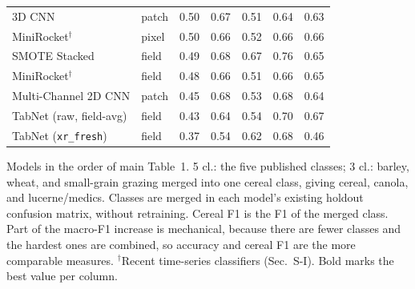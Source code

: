 \documentclass[preprint,authoryear,3p]{elsarticle}
\begin{document}
\begin{table}[!ht]
\begin{tabular}{llccccc}
3D CNN & patch & 0.50 & 0.67 & 0.51 & 0.64 & 0.63 \\
MiniRocket$^{\dagger}$ & pixel & 0.50 & 0.66 & 0.52 & 0.66 & 0.66 \\
SMOTE Stacked & field & 0.49 & 0.68 & 0.67 & 0.76 & 0.65 \\
MiniRocket$^{\dagger}$ & field & 0.48 & 0.66 & 0.51 & 0.66 & 0.65 \\
Multi-Channel 2D CNN & patch & 0.45 & 0.68 & 0.53 & 0.68 & 0.64 \\
TabNet (raw, field-avg) & field & 0.43 & 0.64 & 0.54 & 0.70 & 0.67 \\
TabNet (\texttt{xr\_fresh}) & field & 0.37 & 0.54 & 0.62 & 0.68 & 0.46 \\
\bottomrule
\end{tabular}
\par\vspace{3pt}
\begin{minipage}{\linewidth}
\footnotesize
Models in the order of main Table~1. 5 cl.: the five published classes; 3 cl.: barley, wheat, and small-grain grazing merged into one cereal class, giving cereal, canola, and lucerne/medics. Classes are merged in each model's existing holdout confusion matrix, without retraining. Cereal F1 is the F1 of the merged class. Part of the macro-F1 increase is mechanical, because there are fewer classes and the hardest ones are combined, so accuracy and cereal F1 are the more comparable measures. $^{\dagger}$Recent time-series classifiers (Sec.~S-I). Bold marks the best value per column.
\end{minipage}
\end{table}

\clearpage
\end{document}
